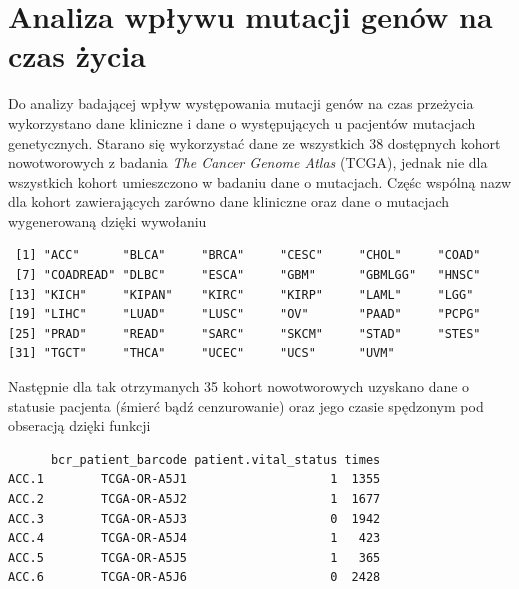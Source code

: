 \newpage

\section{Analiza wpływu mutacji genów na czas życia}\label{chap:analiza}

Do analizy badającej wpływ występowania mutacji genów na czas przeżycia
wykorzystano dane kliniczne i dane o występujących u pacjentów mutacjach
genetycznych. Starano się wykorzystać dane ze wszystkich 38 dostępnych
kohort nowotworowych z badania \textit{The Cancer Genome Atlas} (TCGA),
jednak nie dla wszystkich kohort umieszczono w badaniu dane o mutacjach.
Częśc wspólną nazw dla kohort zawierających zarówno dane kliniczne oraz
dane o mutacjach wygenerowaną dzięki wywołaniu

\begin{Shaded}
\begin{Highlighting}[]
\NormalTok{(}\NormalTok{() ->}\StringTok{ }
\end{Highlighting}
\end{Shaded}

\begin{verbatim}
 [1] "ACC"      "BLCA"     "BRCA"     "CESC"     "CHOL"     "COAD"    
 [7] "COADREAD" "DLBC"     "ESCA"     "GBM"      "GBMLGG"   "HNSC"    
[13] "KICH"     "KIPAN"    "KIRC"     "KIRP"     "LAML"     "LGG"     
[19] "LIHC"     "LUAD"     "LUSC"     "OV"       "PAAD"     "PCPG"    
[25] "PRAD"     "READ"     "SARC"     "SKCM"     "STAD"     "STES"    
[31] "TGCT"     "THCA"     "UCEC"     "UCS"      "UVM"     
\end{verbatim}

Następnie dla tak otrzymanych 35 kohort nowotworowych uzyskano dane o
statusie pacjenta (śmierć bądź cenzurowanie) oraz jego czasie spędzonym
pod obseracją dzięki funkcji

\begin{Shaded}
\begin{Highlighting}[]
\NormalTok{(}\StringTok{ }
\end{Highlighting}
\end{Shaded}

\begin{verbatim}
      bcr_patient_barcode patient.vital_status times
ACC.1        TCGA-OR-A5J1                    1  1355
ACC.2        TCGA-OR-A5J2                    1  1677
ACC.3        TCGA-OR-A5J3                    0  1942
ACC.4        TCGA-OR-A5J4                    1   423
ACC.5        TCGA-OR-A5J5                    1   365
ACC.6        TCGA-OR-A5J6                    0  2428
\end{verbatim}

